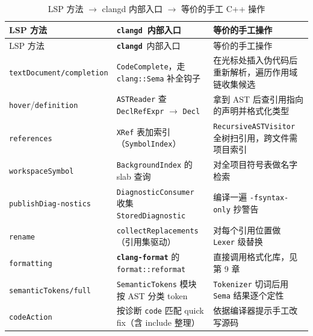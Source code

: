 \documentclass[12pt,a4paper,fontset=fandol]{ctexbook}
\newcommand{\Bk}{\discretionary{}{}{}}
\newcommand{\Lib}[1]{\textbf{\texttt{#1}}}
\newcommand{\Lang}[1]{\textsf{#1}}
\newcommand{\CPP}{\Lang{C++}}
\newcommand{\Fmt}{\Lib{clang-format}}
\newcommand{\CD}{\Lib{clangd}}
\begin{document}
\begin{longtable}{>{\raggedright\arraybackslash}p{}
                  >{\raggedright\arraybackslash}p{}
                  >{\raggedright\arraybackslash}p{}}
\caption{LSP 方法 $\to$ clangd 内部入口 $\to$ 等价的手工 \CPP{} 操作}\label{tab:ch04-methods}\\
\toprule
LSP 方法 & \CD\ 内部入口 & 等价的手工操作 \\
\midrule
\endfirsthead
\toprule
LSP 方法 & \CD\ 内部入口 & 等价的手工操作 \\
\midrule
\endhead
\texttt{textDocument/}\hspace{0pt}\texttt{completion} & \texttt{CodeComplete}，走 \texttt{clang::Sema} 补全钩子 & 在光标处插入伪代码后重新解析，遍历作用域链收集候选 \\
\midrule
\texttt{hover}/{\Bk}\texttt{definition} & \texttt{ASTReader} 查 \texttt{DeclRefExpr} $\to$ \texttt{Decl} & 拿到 AST 后查引用指向的声明并格式化类型 \\
\midrule
\texttt{references} & \texttt{XRef} 表加索引（\texttt{SymbolIndex}） & \texttt{RecursiveAST\hspace{0pt}Visitor} 全树扫引用，跨文件需项目索引 \\
\midrule
\texttt{workspaceSymbol} & \texttt{BackgroundIndex} 的 slab 查询 & 对全项目符号表做名字检索 \\
\midrule
\texttt{publishDiag-}\hspace{0pt}\texttt{nostics} & \texttt{Diagnostic}\hspace{0pt}\texttt{Consumer} 收集 \texttt{StoredDiagnostic} & 编译一遍 \texttt{-fsyntax-only} 抄警告 \\
\midrule
\texttt{rename} & \texttt{collect}\hspace{0pt}\texttt{Replacements}（引用集驱动） & 对每个引用位置做 \texttt{Lexer} 级替换 \\
\midrule
\texttt{formatting} & \Fmt{} 的 \texttt{format::reformat} & 直接调用格式化库，见第 9 章 \\
\midrule
\texttt{semanticTokens/}\hspace{0pt}\texttt{full} & \texttt{SemanticTokens} 模块按 AST 分类 token & \texttt{Tokenizer} 切词后用 \texttt{Sema} 结果逐个定性 \\
\midrule
\texttt{codeAction} & 按诊断 \texttt{code} 匹配 quick fix（含 include 整理） & 依据编译器提示手工改写源码 \\
\bottomrule
\end{longtable}
\end{document}
